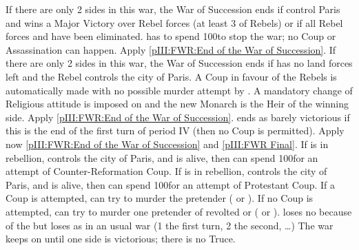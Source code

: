 \begin{digressions}
  \phpaix
  \aparag If there are only 2 sides in this war, the War of Succession ends if
  \FRA control Paris and wins a Major Victory over Rebel forces (at least 3
  \DT of Rebels) or if all Rebel forces and \REVOLT have been eliminated.
  \bparag \FRA has to spend 100\ducats to stop the war; no Coup or
  Assassination can happen. Apply \ref{pIII:FWR:End of the War of Succession}.
  \aparag If there are only 2 sides in this war, the War of Succession ends if
  \FRA has no land forces left and the Rebel controls the city of Paris. A
  Coup in favour of the Rebels is automatically made with no possible murder
  attempt by \FRA. A mandatory change of Religious attitude is imposed on \FRA
  and the new Monarch is the Heir of the winning side. Apply \ref{pIII:FWR:End
    of the War of Succession}.
  \aparag \FRA ends as barely victorious if this is the end of the first turn
  of period IV (then no Coup is permitted). Apply now \ref{pIII:FWR:End of the
    War of Succession} and \ref{pIII:FWR Final}.
  \aparag If \lig is in rebellion, controls the city of Paris, and
   is alive, then \LIG can spend 100\ducats for an
  attempt of Counter-Reformation Coup.
  \aparag If \hug is in rebellion, controls the city of Paris, and
  \leaderNavarre is alive, then \HUG can spend 100\ducats for an attempt of
  Protestant Coup.
  \aparag If a Coup is attempted, \FRA can try to murder the pretender
  ( or \leaderNavarre).
  \aparag If no Coup is attempted, \FRA can try to murder one pretender of
  revolted \lig or \hug ( or \leaderNavarre).
  \aparag \FRA loses no \STAB because of the \REVOLT but loses \STAB as in an
  usual war (1 the first turn, 2 the second, \dots)
  \aparag The war keeps on until one side is victorious; there is no Truce.




\end{digressions}
